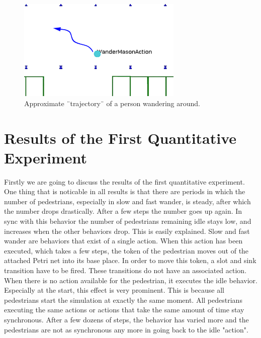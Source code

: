 \documentclass[11pt, a4paper]{book}
\begin{document}
\begin{figure}[h!]
\centering
\includegraphics[width=0.7\textwidth]{"./qualitative experiment pictures/simulated_wander_cropped"}
\caption{Approximate ¨trajectory¨ of a person wandering around.}
\label{fig:simulatedwandertrajectory}
\end{figure}
\clearpage






\section{Results of the First Quantitative Experiment}
\label{sec:firstquantitative}
Firstly we are going to discuss the results of the first quantitative experiment. One thing that is noticable in all results is that there are periods in which the number of pedestrians, especially in slow and fast wander, is steady, after which the number drops drastically. After a few steps the number goes up again. In sync with this behavior the number of pedestrians remaining idle stays low, and increases when the other behaviors drop. This is easily explained. Slow and fast wander are behaviors that exist of a single action. When this action has been executed, which takes a few steps, the token of the pedestrian moves out of the attached Petri net into its base place. In order to move this token, a slot and sink transition have to be fired. These transitions do not have an associated action. When there is no action available for the pedestrian, it executes the idle behavior. Especially at the start, this effect is very prominent. This is because all pedestrians start the simulation at exactly the same moment. All pedestrians executing the same actions or actions that take the same amount of time stay synchronous. After a few dozens of steps, the behavior has varied more and the pedestrians are not as synchronous any more in going back to the idle "action".
\end{document}
